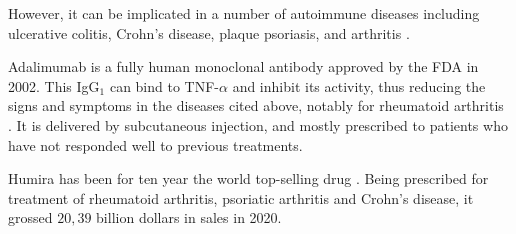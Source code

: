 However, it can be implicated in a number of autoimmune diseases including
ulcerative colitis, Crohn’s disease, plaque psoriasis, and arthritis
\cite{noauthor_adalimumab_2021}.

Adalimumab is a fully human monoclonal antibody approved by the FDA in 2002.
This IgG$_1$ can bind to TNF-$\alpha$ and inhibit its activity, thus reducing the 
signs and symptoms in the diseases cited above, notably for rheumatoid arthritis
\cite{mease_adalimumab_2007}. It is delivered by subcutaneous injection, and mostly
prescribed to patients who have not responded well to previous treatments.

Humira has been for ten year the world top-selling drug \cite{fierce_pharma_humira_2021}.
Being prescribed for treatment of rheumatoid arthritis, psoriatic arthritis and Crohn’s disease,
it grossed $20,39$ billion dollars in sales in 2020.

